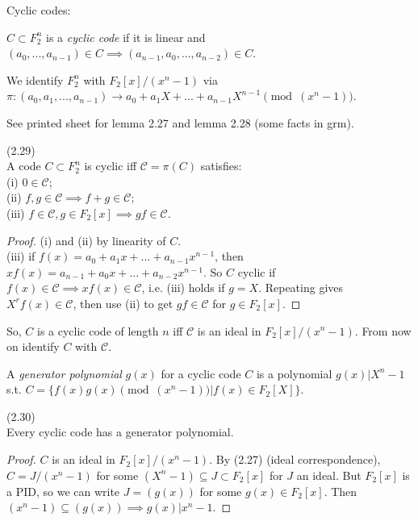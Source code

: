 \documentclass[a4paper]{article}
\begin{document}
Cyclic codes:
\begin{defi}
$C \subset F_2^n$ is a \emph{cyclic code} if it is linear and $(a_0,...,a_{n-1}) \in C \implies (a_{n-1},a_0,...,a_{n-2}) \in C$.

We identify $F_2^n$ with $F_2[x]/(x^n-1)$ via $\pi: (a_0,a_1,...,a_{n-1}) \to a_0+a_1 X + ... + a_{n-1} X^{n-1} \pmod (x^n-1)$.
\end{defi}

See printed sheet for lemma 2.27 and lemma 2.28 (some facts in grm).

\begin{lemma} (2.29)\\
A code $C \subset F_2^n$ is cyclic iff $\mathcal{C}=\pi (C)$ satisfies:\\
(i) $0 \in \mathcal{C}$;\\
(ii) $f,g \in \mathcal{C} \implies f+g \in \mathcal{C}$;\\
(iii) $f \in \mathcal{C}, g \in F_2[x] \implies gf \in \mathcal{C}$.
\begin{proof}
(i) and (ii) by linearity of $C$.\\
(iii) if $f(x) = a_0+a_1 x + ... + a_{n-1}x^{n-1}$, then $xf(x) = a_{n-1}+a_0 x + ... + a_{n-2} x^{n-1}$. So $C$ cyclic if $f(x) \in \mathcal{C} \implies xf(x) \in \mathcal{C}$, i.e. (iii) holds if $g=X$. Repeating gives $X^r f(x) \in \mathcal{C}$, then use (ii) to get $gf \in \mathcal{C}$ for $g \in F_2[x]$.
\end{proof}
\end{lemma}

\begin{rem}
So, $C$ is a cyclic code of length $n$ iff $\mathcal{C}$ is an ideal in $F_2[x]/(x^n-1)$. From now on identify $C$ with $\mathcal{C}$.
\end{rem}

\begin{defi}
A \emph{generator polynomial} $g(x)$ for a cyclic code $C$ is a polynomial $g(x) | X^n-1$ s.t. $C = \{f(x) g(x) \pmod (x^n-1) | f(x) \in F_2[X]\}$.
\end{defi}

\begin{thm} (2.30)\\
Every cyclic code has a generator polynomial.
\begin{proof}
$C$ is an ideal in $F_2[x]/(x^n-1)$. By (2.27) (ideal correspondence), $C = J/(x^n-1)$ for some $(X^n-1) \subseteq J \subset F_2[x]$ for  $J$ an ideal. But $F_2[x]$ is a PID, so we can write $J = (g(x))$ for some $g(x) \in F_2[x]$. Then $(x^n-1) \subseteq (g(x)) \implies g(x) | x^n-1$.
\end{proof}
\end{thm}
\end{document}
